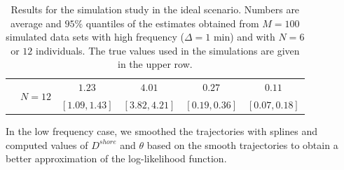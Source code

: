 \documentclass[aoas]{imsart}
\theoremstyle{definition}
\theoremstyle{remark}
\theoremstyle{remark}
\newcommand {\1}{\mathbb{1}}
\begin{document}
\begin{table}[ht!]
\begin{tabular}{|c|c|cccc|}
			\\
			& \multirow{2}{4em}{$N=12$} & $1.23$ &
			$4.01$ &
			$0.27$ & $0.11$ 

			\\
			& & $[1.09,1.43]$  &
			$ [3.82,4.21]$ &
			$ [0.19,0.36]$& $[0.07,0.18] $  \\
            \hline

		\end{tabular}
        \vspace{0.1cm}
		\caption{Results for the simulation study in the ideal scenario. Numbers are average and $95 \%$ quantiles of the estimates obtained from $M=100$ simulated data sets with high frequency ($\Delta = 1$ min) and with $N=6$ or $12$ individuals. The true values used in the simulations are given in the upper row.}
		\label{table: simulation study hf parametric}
	\end{table}


In the low frequency case, we smoothed the trajectories with splines and computed values of $D^{shore}$ and $\theta$ based on the smooth trajectories to obtain a better approximation of the log-likelihood function.
\end{document}
